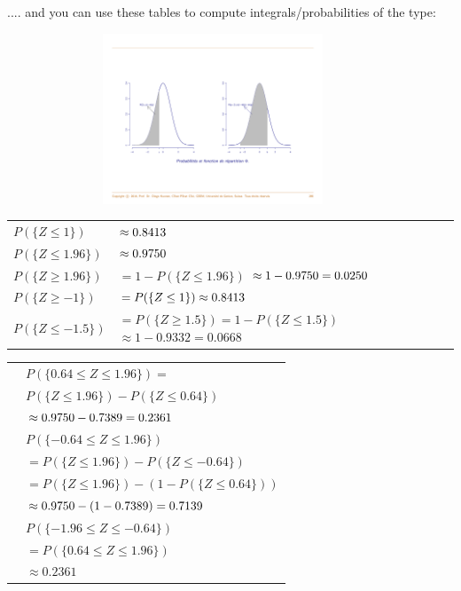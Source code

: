 \documentclass[notes=show,smaller,handout]{beamer}\usepackage[]{graphicx}\usepackage[]{color}
\begin{document}
\begin{frame}{\secname}
.... and you can use these tables to compute integrals/probabilities of the type:
\begin{figure}[ptb]\centering
\includegraphics[height=2in, width=4in]{img/CDF_pr.pdf}%
\end{figure}%
\end{frame}%

\begin{frame}{\secname}

\begin{example}[Prob of $Z$]


\noindent
\begin{tabular}{ll}
$P(\{Z\leq 1\})$ & $\approx0.8413\bigskip $ \\
$P(\{Z\leq 1.96\})$ & $\approx0.9750\bigskip $ \\
$P(\{Z\geq 1.96\})$ & $=1-P(\{Z\leq 1.96\})$ $\approx1-0.9750=0.0250\bigskip $\\
$P(\{Z\geq -1\})$ & $=P(\{Z\leq 1\})\approx0.8413\bigskip $ \\
$P(\{Z\leq -1.5\})$ & $=P(\{Z\geq 1.5\}) =1-P(\{Z\leq 1.5\})$ $\approx1-0.9332=0.0668$%
\end{tabular}

\end{example}
\end{frame}%

\begin{frame}{\secname}

\begin{example}[continued]

\begin{tabular}{ll}
& $P(\{0.64\leq Z\leq 1.96\})=$ \\
& $P(\{Z\leq 1.96\})-P(\{Z\leq 0.64\})$ \\
& $\approx 0.9750-0.7389=0.2361\bigskip $ \\
& $P(\{-0.64\leq Z\leq 1.96\})$ \\
& $=P(\{Z\leq 1.96\})-P(\{Z\leq -0.64\})$ \\
& $=P(\{Z\leq 1.96\})-(1-P(\{Z\leq 0.64\}))$ \\
& $\approx0.9750-(1-0.7389)=0.7139\bigskip $ \\
& $P(\{-1.96\leq Z\leq -0.64\})$ \\
& $=P(\{0.64\leq Z\leq 1.96\})$ \\
& $\approx0.2361$%
\end{tabular}
\end{example}
\end{frame}%
\end{document}
